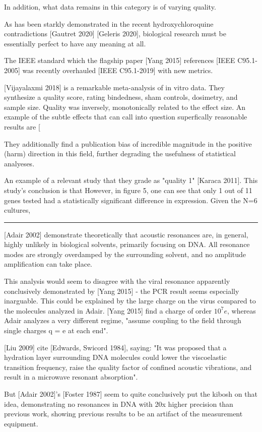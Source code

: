 \documentclass[paper.tex]{subfiles}
\begin{document}
\begin{multicols}{1}
In addition, what data remains in this category is of varying quality. 

As has been starkly demonstrated in the recent hydroxychloroquine contradictions [Gautret 2020] [Geleris 2020], biological research must be essentially perfect to have any meaning at all.


The IEEE standard which the flagship paper [Yang 2015] references [IEEE C95.1-2005] was recently overhauled [IEEE C95.1-2019] with new metrics.


[Vijayalaxmi 2018] is a remarkable meta-analysis of in vitro data. They synthesize a quality score, rating bindedness, sham controls, dosimetry, and sample size. Quality was inversely, monotonically related to the effect size. An example of the subtle effects that can call into question superfically reasonable results are [

They additionally find a publication bias of incredible magnitude in the positive (harm) direction in this field, further degrading the usefulness of statistical analyeses.

An example of a relevant study that they grade as "quality 1" [Karaca 2011]. This study's conclusion is that However, in figure 5, one can see that only 1 out of 11 genes tested had a statistically significant difference in expression. Given the N=6 cultures, 

\rule{\linewidth}{0.2pt}

[Adair 2002] demonstrate theoretically that acoustic resonances are, in general, highly unlikely in biological solvents, primarily focusing on DNA. All resonance modes are strongly overdamped by the surrounding solvent, and no amplitude amplification can take place.

This analysis would seem to disagree with the viral resonance apparently conclusively demonstrated by [Yang 2015] - the PCR result seems especially inarguable. This could be explained by the large charge on the virus compared to the molecules analyzed in Adair. [Yang 2015] find a charge of order $10^7 e$, whereas Adair analyzes a very different regime, "assume coupling to the field through single charges q = e at each end".

[Liu 2009] cite [Edwards, Swicord 1984], saying: "It was proposed that a hydration layer surrounding DNA molecules could lower the viscoelastic transition
frequency, raise the quality factor of confined acoustic vibrations, and result in a microwave resonant absorption". 

But [Adair 2002]'s [Foster 1987] seem to quite conclusively put the kibosh on that idea, demonstrating no resonances in DNA with 20x higher precision than previous work, showing previous results to be an artifact of the measurement equipment.


\end{multicols}
\end{document}
